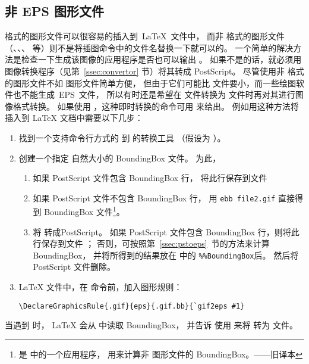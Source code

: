 \subsection{非 EPS 图形文件}\label{ssec:noneps}

 格式的图形文件可以很容易的插入到~\LaTeX{}~文件中，
而非  格式的图形文件（、、、 等）则不是将插图命令中的文件名替换一下就可以的。
一个简单的解决方法是检查一下生成该图像的应用程序是否也可以输出 。
如果不是的话，就必须用图像转换程序（见第~\ref{ssec:convertor} 节）将其转成 PostScript。
尽管使用非  格式的图形文件不如  图形文件简单方便，
但由于它们可能比  文件要小，而一些绘图软件也不能生成~EPS~文件，
所以有时还是希望在  文件转换为  文件时再对其进行图像格式转换。
如果使用 ，这种即时转换的命令可用 来给出。
例如用这种方法将  插入到 \LaTeX{} 文档中需要以下几步：
\begin{enumerate}
	\item 找到一个支持命令行方式的  到  的转换工具
	（假设为 ）。
	\item 创建一个指定  自然大小的 BoundingBox 文件。
	为此，
	\begin{enumerate}
		\item 如果 PostScript 文件包含 BoundingBox 行，
		将此行保存到文件 
		\item 如果 PostScript 文件不包含 BoundingBox 行，
		用 \verb|ebb file2.gif| 直接得到 BoundingBox 文件\footnote{
			 是  中的一个应用程序，
			用来计算非 图形文件的 BoundingBox。——旧译本}。
		\item 将  转成PostScript。
		如果 PostScript 文件包含 BoundingBox 行，则将此行保存到文件 ；
		否则，可按照第~\ref{ssec:pstoeps}~节的方法来计算 BoundingBox，
		并将所得到的结果放在  中的 \verb|%%BoundingBox|后。
		然后将 PostScript 文件删除。
	\end{enumerate}
	\item \LaTeX{} 文件中，在  命令前，加入图形规则：
\begin{lstlisting}
\DeclareGraphicsRule{.gif}{eps}{.gif.bb}{`gif2eps #1}
\end{lstlisting}
\end{enumerate}
当遇到  时，
\LaTeX{} 会从  中读取 BoundingBox，
并告诉  使用  来将  转为  文件。


